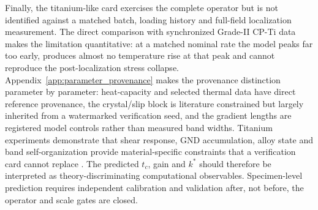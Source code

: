 Finally, the titanium-like card exercises the complete operator but is not identified against a matched batch, loading history and full-field localization measurement. The direct comparison with synchronized Grade-II CP-Ti data makes the limitation quantitative: at a matched nominal rate the model peaks far too early, produces almost no temperature rise at that peak and cannot reproduce the post-localization stress collapse. Appendix~\ref{app:parameter_provenance} makes the provenance distinction parameter by parameter: heat-capacity and selected thermal data have direct reference provenance, the crystal/slip block is literature constrained but largely inherited from a watermarked verification seed, and the gradient lengths are registered model controls rather than measured band widths. Titanium experiments demonstrate that shear response, GND accumulation, alloy state and band self-organization provide material-specific constraints that a verification card cannot replace \cite{GuoEtAl2019PRL,ZhuEtAl2017,RanEtAl2021,XueMeyersNesterenko2002}. The predicted $t_c$, gain and $k^*$ should therefore be interpreted as theory-discriminating computational observables. Specimen-level prediction requires independent calibration and validation after, not before, the operator and scale gates are closed.
